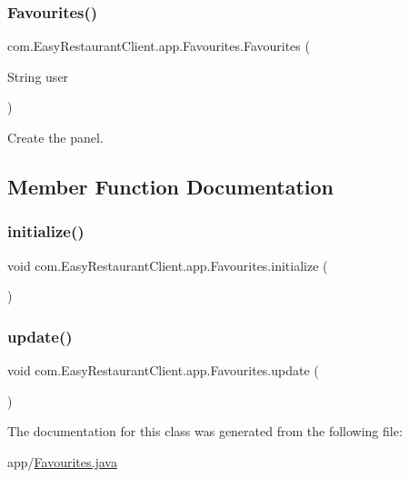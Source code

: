 \subsubsection{\texorpdfstring{Favourites()}{Favourites()}}
{\footnotesize\ttfamily com.\+Easy\+Restaurant\+Client.\+app.\+Favourites.\+Favourites (\begin{DoxyParamCaption}\item[{String}]{user }\end{DoxyParamCaption})}

Create the panel. 

\subsection{Member Function Documentation}
\mbox{\label{classcom_1_1_easy_restaurant_client_1_1app_1_1_favourites_a96b0ed36fe7d35f9f9e98d353ea832de}} 
\subsubsection{\texorpdfstring{initialize()}{initialize()}}
{\footnotesize\ttfamily void com.\+Easy\+Restaurant\+Client.\+app.\+Favourites.\+initialize (\begin{DoxyParamCaption}{ }\end{DoxyParamCaption})}

\mbox{\label{classcom_1_1_easy_restaurant_client_1_1app_1_1_favourites_acc2a4c2c279d0cd13334f273bbb4c1a3}} 
\subsubsection{\texorpdfstring{update()}{update()}}
{\footnotesize\ttfamily void com.\+Easy\+Restaurant\+Client.\+app.\+Favourites.\+update (\begin{DoxyParamCaption}{ }\end{DoxyParamCaption})}



The documentation for this class was generated from the following file\+:\begin{DoxyCompactItemize}
\item 
app/\mbox{\hyperlink{_favourites_8java}{Favourites.\+java}}\end{DoxyCompactItemize}
